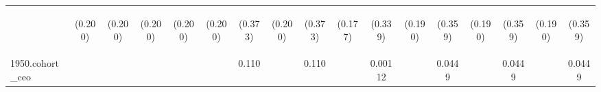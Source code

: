 \begin{center}
\begin{tabular}{lcccccccccccccccc}
\vspace{4pt} & \begin{footnotesize}(0.200)\end{footnotesize} & \begin{footnotesize}(0.200)\end{footnotesize} & \begin{footnotesize}(0.200)\end{footnotesize} & \begin{footnotesize}(0.200)\end{footnotesize} & \begin{footnotesize}(0.200)\end{footnotesize} & \begin{footnotesize}(0.373)\end{footnotesize} & \begin{footnotesize}(0.200)\end{footnotesize} & \begin{footnotesize}(0.373)\end{footnotesize} & \begin{footnotesize}(0.177)\end{footnotesize} & \begin{footnotesize}(0.339)\end{footnotesize} & \begin{footnotesize}(0.190)\end{footnotesize} & \begin{footnotesize}(0.359)\end{footnotesize} & \begin{footnotesize}(0.190)\end{footnotesize} & \begin{footnotesize}(0.359)\end{footnotesize} & \begin{footnotesize}(0.190)\end{footnotesize} & \begin{footnotesize}(0.359)\end{footnotesize} \\
1950.cohort\_ceo &  &  &  &  &  & 0.110 &  & 0.110 &  & 0.00112 &  & 0.0449 &  & 0.0449 &  & 0.0449 \\

\end{tabular}
\end{center}
